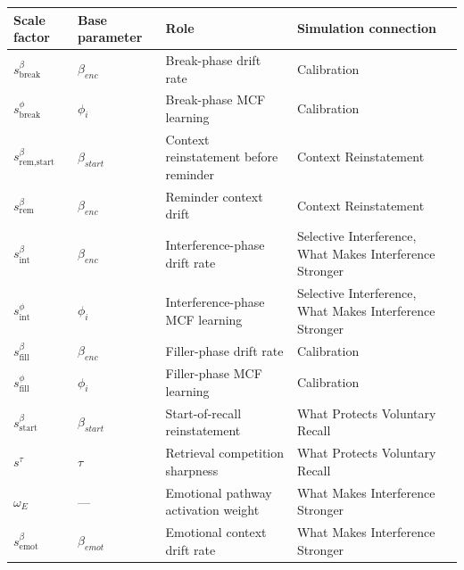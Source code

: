 \documentclass[
  man,
  floatsintext,
  longtable,
  nolmodern,
  notxfonts,
  notimes,
  draftfirst,
  colorlinks=true,linkcolor=blue,citecolor=blue,urlcolor=blue]{apa7}
\begin{document}
\begin{table}

{\caption{{Scale factors and their simulation connections. Drift scales
are clipped to \([0, 1]\) after
multiplication.}{\label{tbl-scale-factors}}}
\vspace{-20pt}}

\begin{longtable}[]{@{}
  >{\raggedright\arraybackslash}p{}
  >{\raggedright\arraybackslash}p{}
  >{\raggedright\arraybackslash}p{}
  >{\raggedright\arraybackslash}p{}@{}}
\toprule\noalign{}
\begin{minipage}[b]{\linewidth}\raggedright
Scale factor
\end{minipage} & \begin{minipage}[b]{\linewidth}\raggedright
Base parameter
\end{minipage} & \begin{minipage}[b]{\linewidth}\raggedright
Role
\end{minipage} & \begin{minipage}[b]{\linewidth}\raggedright
Simulation connection
\end{minipage} \\
\midrule\noalign{}
\endhead
\bottomrule\noalign{}
\endlastfoot
\(s^{\beta}_\text{break}\) & \(\beta_{enc}\) & Break-phase drift rate &
Calibration \\
\(s^{\phi}_\text{break}\) & \(\phi_i\) & Break-phase MCF learning &
Calibration \\
\(s^{\beta}_\text{rem,start}\) & \(\beta_{start}\) & Context
reinstatement before reminder & Context Reinstatement \\
\(s^{\beta}_\text{rem}\) & \(\beta_{enc}\) & Reminder context drift &
Context Reinstatement \\
\(s^{\beta}_\text{int}\) & \(\beta_{enc}\) & Interference-phase drift
rate & Selective Interference, What Makes Interference Stronger \\
\(s^{\phi}_\text{int}\) & \(\phi_i\) & Interference-phase MCF learning &
Selective Interference, What Makes Interference Stronger \\
\(s^{\beta}_\text{fill}\) & \(\beta_{enc}\) & Filler-phase drift rate &
Calibration \\
\(s^{\phi}_\text{fill}\) & \(\phi_i\) & Filler-phase MCF learning &
Calibration \\
\(s^{\beta}_\text{start}\) & \(\beta_{start}\) & Start-of-recall
reinstatement & What Protects Voluntary Recall \\
\(s^{\tau}\) & \(\tau\) & Retrieval competition sharpness & What
Protects Voluntary Recall \\
\(\omega_E\) & --- & Emotional pathway activation weight & What Makes
Interference Stronger \\
\(s^{\beta}_\text{emot}\) & \(\beta_{emot}\) & Emotional context drift
rate & What Makes Interference Stronger \\
\end{longtable}

\end{table}
\end{document}
